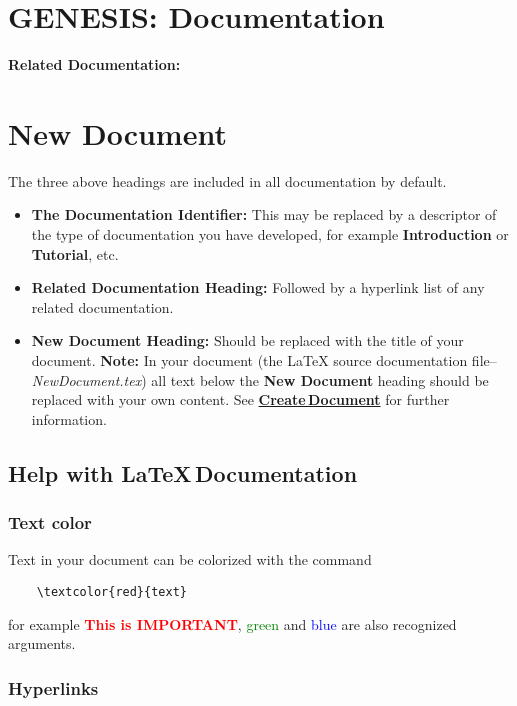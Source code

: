 \documentclass[12pt]{article}
\begin{document}
\section*{GENESIS: Documentation}

{\bf Related Documentation:}

\section*{New Document}

The three above headings are included in all documentation by default.

\begin{itemize}
\item[]  {\bf The Documentation Identifier:} This may be replaced by a descriptor of the type of documentation you have developed, for example {\bf Introduction} or {\bf Tutorial}, etc.
\item[]{\bf Related Documentation Heading:} Followed by a hyperlink list of any related documentation.
\item[] {\bf New Document Heading:} Should be replaced with the title of your document. {\bf Note:} In your document (the \LaTeX\,\,source documentation file--{\it NewDocument.tex}) all text below the {\bf New Document} heading should be replaced with your own content. See \href{../document-create/document-create.tex}{\bf Create\,Document} for further information.
\end{itemize}

\subsection*{Help with \LaTeX\,Documentation}

\subsubsection*{Text color}

Text in your document can be colorized  with the command
\begin{verbatim}
    \textcolor{red}{text}
\end{verbatim}
for example \textcolor{red}{\bf This is IMPORTANT}, \textcolor{green}{green} and \textcolor{blue}{blue} are also recognized arguments.

\subsubsection*{Hyperlinks}
\end{document}
